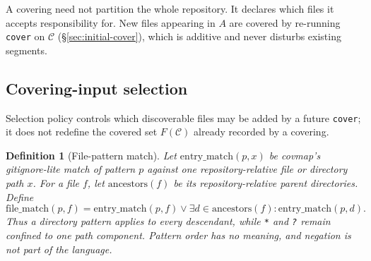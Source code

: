 \documentclass[11pt,a4paper]{article}
\newtheorem{definition}{Definition}[section]
\newcommand{\Cov}{\mathcal{C}}
\begin{document}
A covering need not partition the whole repository. It declares which
files it accepts responsibility for. New files appearing in $A$ are
covered by re-running \texttt{cover} on $\Cov$ (\S\ref{sec:initial-cover}),
which is additive and never disturbs existing segments.

\subsection{Covering-input selection}\label{sec:selection}

Selection policy controls which discoverable files may be added by a future
\texttt{cover}; it does not redefine the covered set $F(\Cov)$ already
recorded by a covering.

\begin{definition}[File-pattern match]\label{def:file-match}
Let $\mathrm{entry\_match}(p,x)$ be covmap's gitignore-lite match of pattern
$p$ against one repository-relative file or directory path $x$. For a file
$f$, let $\mathrm{ancestors}(f)$ be its repository-relative parent
directories. Define
\[
  \mathrm{file\_match}(p,f) =
    \mathrm{entry\_match}(p,f)
    \lor
    \exists d \in \mathrm{ancestors}(f):
      \mathrm{entry\_match}(p,d).
\]
Thus a directory pattern applies to every descendant, while \texttt{*} and
\texttt{?} remain confined to one path component. Pattern order has no
meaning, and negation is not part of the language.
\end{definition}
\end{document}
